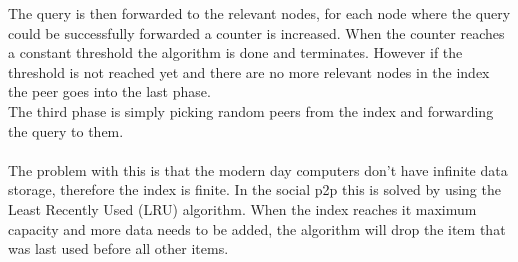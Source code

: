 		The query is then forwarded to the relevant nodes, for each node where the query could be successfully forwarded a counter is increased.
		When the counter reaches a constant threshold the algorithm is done and terminates.
		However if the threshold is not reached yet and there are no more relevant nodes in the index the peer goes into the last phase.\\
		The third phase is simply picking random peers from the index and forwarding the query to them.\\
		\\
		The problem with this is that the modern day computers don't have infinite data storage, therefore the index is finite.
		In the social p2p this is solved by using the Least Recently Used (LRU) algorithm.
		When the index reaches it maximum capacity and more data needs to be added, the algorithm will drop the item that was last used before all other items.\\
		\\	
